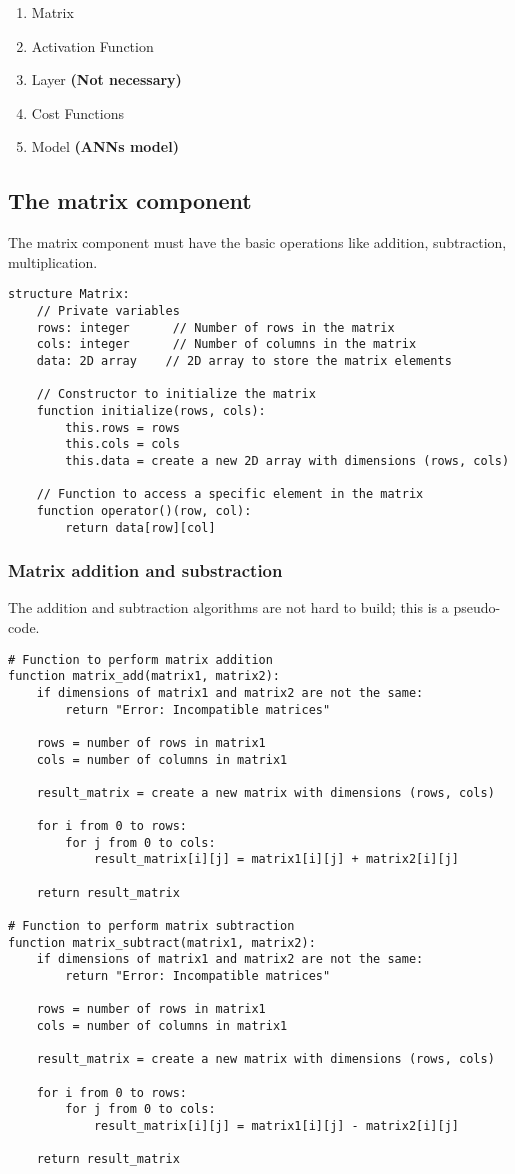 \begin{enumerate}
\item Matrix
\item Activation Function
\item Layer \textbf{(Not necessary)}
\item Cost Functions
\item Model \textbf{(ANNs model)}
\end{enumerate}

\subsection{The matrix component}
The matrix component must have the basic operations like addition, subtraction, multiplication.
\begin{verbatim}
structure Matrix:
    // Private variables
    rows: integer      // Number of rows in the matrix
    cols: integer      // Number of columns in the matrix
    data: 2D array    // 2D array to store the matrix elements

    // Constructor to initialize the matrix
    function initialize(rows, cols):
        this.rows = rows
        this.cols = cols
        this.data = create a new 2D array with dimensions (rows, cols)

    // Function to access a specific element in the matrix
    function operator()(row, col):
        return data[row][col]
\end{verbatim}

\subsubsection{Matrix addition and substraction}
The addition and subtraction algorithms are not hard to build; this is a pseudo-code.
\begin{verbatim}
# Function to perform matrix addition
function matrix_add(matrix1, matrix2):
    if dimensions of matrix1 and matrix2 are not the same:
        return "Error: Incompatible matrices"
    
    rows = number of rows in matrix1
    cols = number of columns in matrix1
    
    result_matrix = create a new matrix with dimensions (rows, cols)
    
    for i from 0 to rows:
        for j from 0 to cols:
            result_matrix[i][j] = matrix1[i][j] + matrix2[i][j]
            
    return result_matrix

# Function to perform matrix subtraction
function matrix_subtract(matrix1, matrix2):
    if dimensions of matrix1 and matrix2 are not the same:
        return "Error: Incompatible matrices"
    
    rows = number of rows in matrix1
    cols = number of columns in matrix1
    
    result_matrix = create a new matrix with dimensions (rows, cols)
    
    for i from 0 to rows:
        for j from 0 to cols:
            result_matrix[i][j] = matrix1[i][j] - matrix2[i][j]
            
    return result_matrix
\end{verbatim}
